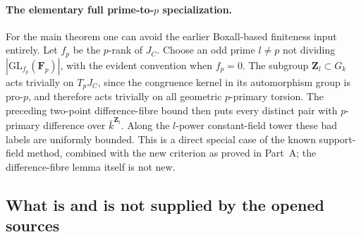 \documentclass[11pt,a4paper]{article}
\newcommand{\Z}{\mathbf Z}
\newcommand{\F}{\mathbf F}
\begin{document}
\paragraph{The elementary full prime-to-$p$ specialization.}
For the main theorem one can avoid the earlier Boxall-based finiteness
input entirely. Let $f_p$ be the $p$-rank of $J_C$. Choose an odd prime
$l\ne p$ not dividing $|\mathrm{GL}_{f_p}(\F_p)|$, with the evident
convention when $f_p=0$. The subgroup $\Z_l\subset G_k$ acts trivially
on $T_pJ_C$, since the congruence kernel in its automorphism group is
pro-$p$, and therefore acts trivially on all geometric $p$-primary
torsion. The preceding two-point difference-fibre bound then puts
every distinct pair with $p$-primary difference over
$\bar k^{\Z_l}$. Along the $l$-power constant-field tower these bad
labels are uniformly bounded. This is a direct special case of the
known support-field method, combined with the new criterion as proved
in Part~A; the difference-fibre lemma itself is not new.

\subsection{What is and is not supplied by the opened sources}
\end{document}
